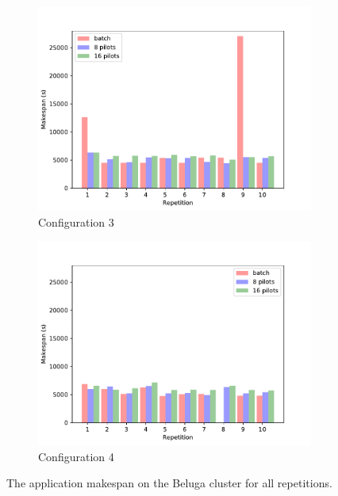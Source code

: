 \begin{figure}
\begin{subfigure}[b]{0.475\textwidth}
		\centering
		\includegraphics[width=\textwidth]{figures/spa/dedicated_3_beluga}
		\caption[]%
		{{\small Configuration 3}}
		\label{fig:spa:beluga3}
	    \end{subfigure}
	    \quad
	    \begin{subfigure}[b]{0.475\textwidth}
		\centering
		\includegraphics[width=\textwidth]{figures/spa/dedicated_4_beluga}
		\caption[]%
		{{\small Configuration 4}}
		\label{fig:spa:beluga4}
	    \end{subfigure}
	    \caption{\small The application makespan on the Beluga cluster for all repetitions.}
	    \label{fig:spa:makespansbeluga}
	\end{figure}
    
